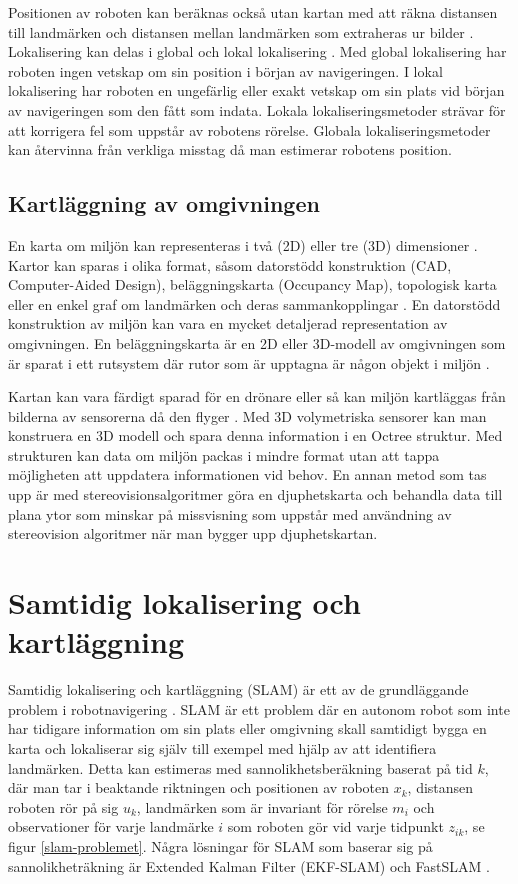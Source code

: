 Positionen av roboten kan beräknas också utan kartan med att räkna distansen till landmärken och distansen mellan landmärken som extraheras ur bilder \citep{realslamproblem}. Lokalisering kan delas i global och lokal lokalisering \citep{982903, globalsubmaps}. Med global lokalisering har roboten ingen vetskap om sin position i början av navigeringen. I lokal lokalisering har roboten en ungefärlig eller exakt vetskap om sin plats vid början av navigeringen som den fått som indata. Lokala lokaliseringsmetoder strävar för att korrigera fel som uppstår av robotens rörelse. Globala lokaliseringsmetoder kan återvinna från verkliga misstag då man estimerar robotens position.

\section{Kartläggning av omgivningen}

En karta om miljön kan representeras i två (2D) eller tre (3D) dimensioner \citep{geospatial}. Kartor kan sparas i olika format, såsom datorstödd konstruktion (CAD, Computer-Aided Design), beläggningskarta (Occupancy Map), topologisk karta eller en enkel graf om landmärken och deras sammankopplingar \citep{982903}. En datorstödd konstruktion av miljön kan vara en mycket detaljerad representation av omgivningen. En beläggningskarta är en 2D eller 3D-modell av omgivningen som är sparat i ett rutsystem där rutor som är upptagna är någon objekt i miljön \citep{6095058, 982903}. 

Kartan kan vara färdigt sparad för en drönare eller så kan miljön kartläggas från bilderna av sensorerna då den flyger \citep{geospatial}. Med 3D volymetriska sensorer kan man konstruera en 3D modell och spara denna information i en Octree struktur. Med strukturen kan data om miljön packas i mindre format utan att tappa möjligheten att uppdatera informationen vid behov. En annan metod som tas upp är med stereovisionsalgoritmer göra en djuphetskarta och behandla data till plana ytor som minskar på missvisning som uppstår med användning av stereovision algoritmer när man bygger upp djuphetskartan.

\chapter{Samtidig lokalisering och kartläggning}

Samtidig lokalisering och kartläggning (SLAM) är ett av de grundläggande problem i robotnavigering \citep{realslamproblem}. SLAM är ett problem där en autonom robot som inte har tidigare information om sin plats eller omgivning skall samtidigt bygga en karta och lokaliserar sig själv till exempel med hjälp av att identifiera landmärken. Detta kan estimeras med sannolikhetsberäkning baserat på tid $k$, där man tar i beaktande riktningen och positionen av roboten $x_k$, distansen roboten rör på sig $u_k$, landmärken som är invariant för rörelse $m_i$ och observationer för varje landmärke $i$ som roboten gör vid varje tidpunkt $z_{ik}$, se figur \ref{slam-problemet}. Några lösningar för SLAM som baserar sig på sannolikheträkning är Extended Kalman Filter (EKF-SLAM) och FastSLAM \citep{realslamproblem}. 

